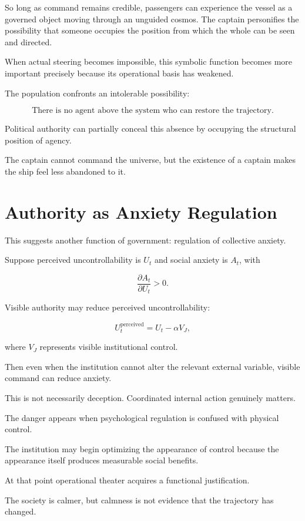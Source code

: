 \documentclass[11pt,oneside]{book}
\theoremstyle{definition}
\theoremstyle{remark}
\begin{document}
So long as command remains credible, passengers can experience the vessel as a governed object moving through an unguided cosmos. The captain personifies the possibility that someone occupies the position from which the whole can be seen and directed.

When actual steering becomes impossible, this symbolic function becomes more important precisely because its operational basis has weakened.

The population confronts an intolerable possibility:

\[
\text{There is no agent above the system who can restore the trajectory.}
\]

Political authority can partially conceal this absence by occupying the structural position of agency.

The captain cannot command the universe, but the existence of a captain makes the ship feel less abandoned to it.

\section{Authority as Anxiety Regulation}

This suggests another function of government: regulation of collective anxiety.

Suppose perceived uncontrollability is \(U_t\) and social anxiety is \(A_t\), with

\[
\frac{\partial A_t}{\partial U_t}>0.
\]

Visible authority may reduce perceived uncontrollability:

\[
U_t^{\mathrm{perceived}}
=
U_t-\alpha V_J,
\]

where \(V_J\) represents visible institutional control.

Then even when the institution cannot alter the relevant external variable, visible command can reduce anxiety.

This is not necessarily deception. Coordinated internal action genuinely matters.

The danger appears when psychological regulation is confused with physical control.

The institution may begin optimizing the appearance of control because the appearance itself produces measurable social benefits.

At that point operational theater acquires a functional justification.

The society is calmer, but calmness is not evidence that the trajectory has changed.
\end{document}
